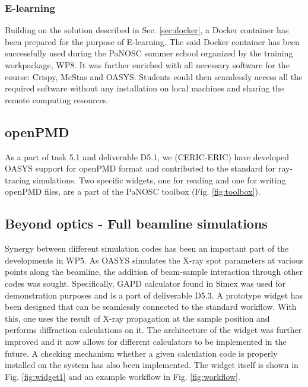\documentclass[11pt, a4paper]{article}
\begin{document}
\subsubsection{E-learning}

Building on the solution described in Sec. \ref{sec:docker}, a Docker container has been prepared for the purpose of E-learning. The said Docker container has been successfully used during the PaNOSC summer school organized by the training workpackage, WP8. It was further enriched with all necessary software for the course: Crispy, McStas and OASYS. Students could then seamlessly access all the required software without any installation on local machines and sharing the remote computing resources.

\subsection{openPMD}

As a part of task 5.1 and deliverable D5.1, we (CERIC-ERIC) have developed OASYS support for openPMD format and contributed to the standard for ray-tracing simulations. Two specific widgets, one for reading and one for writing openPMD files, are a part of the PaNOSC toolbox (Fig. \ref{fig:toolbox}).

\subsection{Beyond optics - Full beamline simulations}

Synergy between different simulation codes has been an important part of the developments in WP5. As OASYS simulates the X-ray spot parameters at various points along the beamline, the addition of beam-sample interaction through other codes was sought. Specifically, GAPD calculator found in Simex was used for demonstration purposes and is a part of deliverable D5.3. A prototype widget has been designed that can be seamlessly connected to the standard workflow. With this, one uses the result of X-ray propagation at the sample position and performs diffraction calculations on it. The architecture of the widget was further improved and it now allows for different calculators to be implemented in the future. A checking mechanism whether a given calculation code is properly installed on the system has also been implemented. The widget itself is shown in Fig. \ref{fig:widget1} and an example workflow in Fig. \ref{fig:workflow}.
\end{document}
